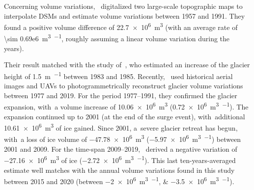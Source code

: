 Concerning volume variations,~\cite{Diolaiuti2003} digitalized two large-scale
topographic maps to interpolate DSMs and estimate volume variations between 1957 and
1991.
They found a positive volume difference of
\SI[retain-explicit-plus]{+22.7e6}{\cubic\meter} (with an average rate of \SI{\sim
    0.69e6}{\cubic\m\per\year}, roughly assuming a linear volume variation during the
years).

Their result matched with the study of~\cite{Roethlisberger1985}, who estimated an
increase of the glacier height of \SI[retain-explicit-plus]{+1.5}{\m\per\year} between
1983 and 1985.
Recently,~\cite{Degaetani2021} used historical aerial images and UAVs to
photogrammetrically reconstruct glacier volume variations between 1977 and 2019.
For the period 1977--1991, they confirmed the glacier expansion, with~a volume
increase of \SI[retain-explicit-plus]{+10.06e6}{\cubic\meter}
(\SI[retain-explicit-plus]{+0.72e6}{\cubic\m\per\year}).
The expansion continued up to 2001 (at the end of the surge event), with~additional
\SI{10.61e6}{\cubic\m} of ice gained.
Since 2001, a~severe glacier retreat has begun, with~a loss of ice volume of
\SI{-47.78e6}{\cubic\meter} (\SI{-5.97e6}{\cubic\meter\per\year}) between 2001 and 2009.
For the time-span 2009--2019,~\citep{Degaetani2021} derived a negative variation of
\SI{-27.16e6}{\cubic\m} of ice (\SI{-2.72e6}{\cubic\meter\per\year}).
This last ten-years-averaged estimate well matches with the annual volume variations
found in this study between 2015 and 2020 (between
\SIlist{-2e6;-3.5e6}{\cubic\meter\per\year}).



\makechapterbibliography{}

